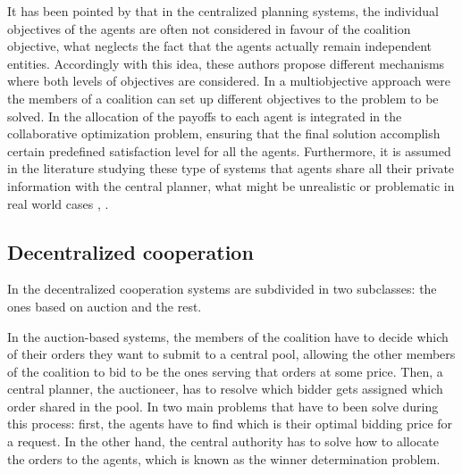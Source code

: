\documentclass[authoryear]{elsarticle}
\begin{document}
It has been pointed by \cite{DEFRYN2018891} that in the centralized planning systems, the individual objectives
of the agents are often not considered in favour of the coalition objective, what neglects the fact that the agents actually remain independent entities.  Accordingly with this idea,
these authors propose different mechanisms where both levels of objectives are
considered. In \cite{DEFRYN20191} a multiobjective approach were the members of a coalition can set up different objectives to the problem to be solved. In \cite{VANOVERMEIRE2014125} the allocation of the payoffs to each agent is integrated in the collaborative optimization problem, ensuring that the final solution accomplish certain predefined satisfaction level for all the agents. Furthermore, it is assumed
in the literature studying these type of systems that agents share all their private information
with the central planner, what might be unrealistic or problematic in real world cases \citep{SERRANO2017}, \citep{ZENG2015}.


\subsection{Decentralized cooperation}

In \cite{GANTERER2017} the decentralized cooperation systems are subdivided in two subclasses:  the ones based on auction and the rest. 

In the auction-based systems, the members of the coalition have to decide which of their orders they want to submit to a central pool, allowing the other members of the coalition to bid to be the ones serving that orders at some price. Then, a central planner, the auctioneer, has to resolve which bidder gets assigned which order shared in the pool. In \citep{PAN2019} two main problems that have to been solve during this process: first, the agents have to find which is their optimal bidding price for a request. In the other hand, the central authority has to solve how to allocate the orders to the agents, which is known as the winner determination problem. 
\end{document}
